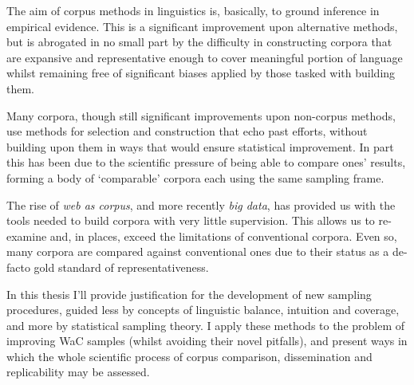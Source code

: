 %


% 

   
The aim of corpus methods in linguistics is, basically, to ground inference in empirical evidence.  This is a significant improvement upon alternative methods, but is abrogated in no small part by the difficulty in constructing corpora that are expansive and representative enough to cover meaningful portion of language whilst remaining free of significant biases applied by those tasked with building them.

Many corpora, though still significant improvements upon non-corpus methods, use methods for selection and construction that echo past efforts, without building upon them in ways that would ensure statistical improvement.  In part this has been due to the scientific pressure of being able to compare ones' results, forming a body of `comparable' corpora each using the same sampling frame.

The rise of \textsl{web as corpus}, and more recently \textsl{big data}, has provided us with the tools needed to build corpora with very little supervision.  This allows us to re-examine and, in places, exceed the limitations of conventional corpora.  Even so, many corpora are compared against conventional ones due to their status as a de-facto gold standard of representativeness.

In this thesis I'll provide justification for the development of new sampling procedures, guided less by concepts of linguistic balance, intuition and coverage, and more by statistical sampling theory.  I apply these methods to the problem of improving WaC samples (whilst avoiding their novel pitfalls), and present ways in which the whole scientific process of corpus comparison, dissemination and replicability may be assessed.
